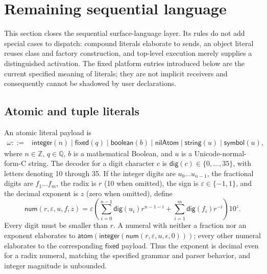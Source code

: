 \documentclass[11pt]{article}
\numberwithin{equation}{section}
\newcommand{\kw}[1]{\ensuremath{\mathsf{#1}}}
\begin{document}
\section{Remaining sequential language}
\label{sec:remaining-sequential}

This section closes the sequential surface-language layer.  Its rules do not
add special cases to dispatch: compound literals elaborate to sends, an object
literal reuses class and factory construction, and top-level execution merely
supplies a distinguished activation.  The fixed platform entries introduced
below are the current specified meaning of literals; they are not implicit
receivers and consequently cannot be shadowed by user declarations.

\subsection{Atomic and tuple literals}
\label{sec:literals}

An atomic literal payload is
\begin{equation}\label{eq:atom-payload}
\begin{split}
 \omega::={}&\kw{integer}(n)\mid\kw{fixed}(q)\mid
 \kw{boolean}(b)\mid\kw{nilAtom}\mid
 \kw{string}(u)\mid\kw{symbol}(u),
\end{split}
\end{equation}
where $n\in\mathbb Z$, $q\in\mathbb Q$, $b$ is a mathematical Boolean, and
$u$ is a Unicode-normal-form-C string.  The decoder
for a digit character $c$ is $\mathsf{dig}(c)\in\{0,\ldots,35\}$, with letters
denoting 10 through 35.  If the integer digits are
$u_0\ldots u_{n-1}$, the fractional digits are $f_1\ldots f_m$, the radix is
$r$ (10 when omitted), the sign is $\varepsilon\in\{-1,1\}$, and the decimal
exponent is $z$ (zero when omitted), define
\begin{equation}\label{eq:number-decoding}
 \mathsf{num}(r,\varepsilon,u,f,z)=
 \varepsilon\left(
   \sum_{i=0}^{n-1}\mathsf{dig}(u_i)r^{n-1-i}+
   \sum_{i=1}^{m}\mathsf{dig}(f_i)r^{-i}
 \right)10^z.
\end{equation}
Every digit must be smaller than $r$.  A numeral with neither a fraction nor
an exponent elaborates to
$\kw{atom}(\kw{integer}(\mathsf{num}(r,\varepsilon,u,\epsilon,0)))$;
every other numeral elaborates to the corresponding $\kw{fixed}$ payload.
Thus the exponent is decimal even for a radix numeral, matching the specified
grammar and parser behavior, and integer magnitude is unbounded.
\end{document}
